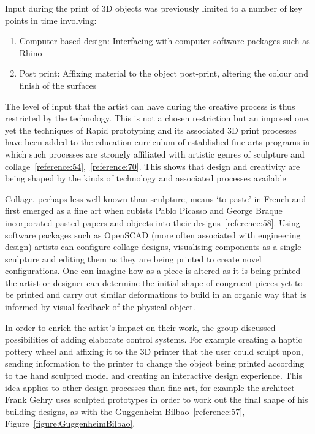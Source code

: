 \documentclass[11pt]{report} %
\begin{document}
	Input during the print of 3D objects was previously limited to a number of key points in time involving: 
\begin{enumerate}
\item Computer based design: Interfacing with computer software packages such as Rhino
\item Post print: Affixing material to the object post-print, altering the colour and finish of the surfaces
\end{enumerate}

	The level of input that the artist can have during the creative process is thus restricted by the technology. This is not a chosen restriction but an imposed one, yet the techniques of Rapid prototyping and its associated 3D print processes have been added to the education curriculum of established fine arts programs in which such processes are strongly affiliated with artistic genres of sculpture and collage~\ref{reference:54},~\ref{reference:70}. This shows that design and creativity are being shaped by the kinds of technology and associated processes available 

	Collage, perhaps less well known than sculpture, means `to paste' in French and first emerged as a fine art when cubists Pablo Picasso and George Braque incorporated pasted papers and objects into their designs~\ref{reference:58}. Using software packages such as OpenSCAD (more often associated with engineering design) artists can configure collage designs, visualising components as a single sculpture and editing them as they are being printed to create novel configurations. One can imagine how as a piece is altered as it is being printed the artist or designer can determine the initial shape of congruent pieces yet to be printed and carry out similar deformations to build in an organic way that is informed by visual feedback of the physical object.

	In order to enrich the artist's impact on their work, the group discussed possibilities of adding elaborate control systems. For example creating a haptic pottery wheel and affixing it to the 3D printer that the user could sculpt upon, sending information to the printer to change the object being printed according to the hand sculpted model and creating an interactive design experience. This idea applies to other design processes than fine art, for example the architect Frank Gehry uses sculpted prototypes in order to work out the final shape of his building designs, as with the Guggenheim Bilbao~\ref{reference:57}, Figure~\ref{figure:GuggenheimBilbao}.
\end{document}

